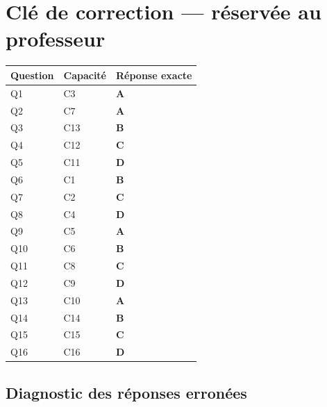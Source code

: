 \ifnxVersionProfesseur
\clearpage
\section*{Clé de correction — réservée au professeur}

\begin{center}
\begin{tabular}{lll}
\hline
Question & Capacité & Réponse exacte \\
\hline
Q1 & C3 & \textbf{A} \\
Q2 & C7 & \textbf{A} \\
Q3 & C13 & \textbf{B} \\
Q4 & C12 & \textbf{C} \\
Q5 & C11 & \textbf{D} \\
Q6 & C1 & \textbf{B} \\
Q7 & C2 & \textbf{C} \\
Q8 & C4 & \textbf{D} \\
Q9 & C5 & \textbf{A} \\
Q10 & C6 & \textbf{B} \\
Q11 & C8 & \textbf{C} \\
Q12 & C9 & \textbf{D} \\
Q13 & C10 & \textbf{A} \\
Q14 & C14 & \textbf{B} \\
Q15 & C15 & \textbf{C} \\
Q16 & C16 & \textbf{D} \\
\hline
\end{tabular}
\end{center}

\subsection*{Diagnostic des réponses erronées}


